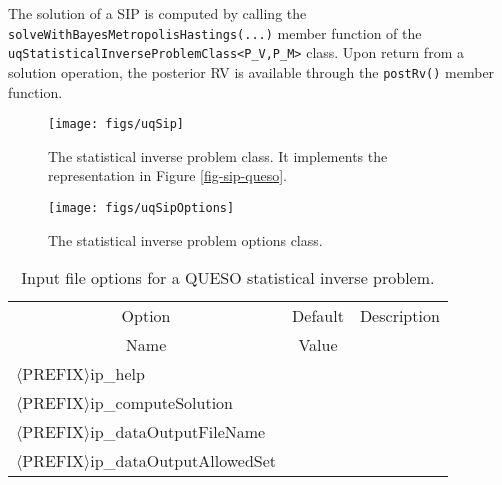 The solution of a SIP is computed by calling the \verb+solveWithBayesMetropolisHastings(...)+ member function of the \verb+uqStatisticalInverseProblemClass<P_V,P_M>+ class.
Upon return from a solution operation, the posterior RV is available through the \verb+postRv()+ member function.


\begin{figure}[h!]
\centerline{
\texttt{[image: figs/uqSip]}
}
\caption{
The statistical inverse problem class. It implements the representation in Figure \ref{fig-sip-queso}.
}
\label{fig-sip-class}
\end{figure}

\begin{figure}[h!]
\begin{center}
\texttt{[image: figs/uqSipOptions]}
\end{center}
\caption{
The statistical inverse problem options class.
}
\label{fig-sip-options-class}
\end{figure}

\begin{table}[!h]
\begin{center}
\begin{tabular}{|l|c|c|}
\hline
\multicolumn{1}{|c|}{Option}                     & Default & Description \\
\multicolumn{1}{|c|}{Name}                       & Value   &             \\
\hline
\hline
$\langle$PREFIX$\rangle$ip\_help                 &         &             \\
\hline
$\langle$PREFIX$\rangle$ip\_computeSolution      &         &             \\
\hline
$\langle$PREFIX$\rangle$ip\_dataOutputFileName   &         &             \\
\hline
$\langle$PREFIX$\rangle$ip\_dataOutputAllowedSet &         &             \\
\hline
\end{tabular}
\end{center}
\caption{
Input file options for a QUESO statistical inverse problem.
}
\label{tab-sip-options}
\end{table}

